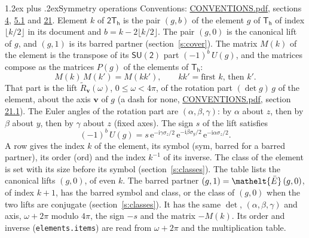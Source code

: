 \documentclass[10pt,a4paper]{article}
\makeatletter
\renewcommand\section{\@startsection{section}{1}{\z@}{-3ex plus -1ex minus -.2ex}%
  {1.2ex plus .2ex}{\normalfont\large\sffamily\bfseries\color{parttitle}}}
\numberwithin{equation}{section}
\newcommand{\eltfont}[1]{{\let\sigma\eltsigma\mathelt{#1}}}
\newcommand{\grp}[1]{\mathsf{#1}}
\newcommand{\elt}[1]{\eltfont{#1}}
\newcommand{\vv}{\mathbf{v}}
\newcommand{\iunit}{\mathrm{i}}
\newcommand{\expe}{\mathrm{e}}
\newcommand{\barred}[1]{\bar{#1}}
\newcommand{\lift}[1]{\tilde{#1}}
\newcommand{\pauli}[1]{\sigma_{#1}}
\makeatother
\begin{document}
\section{Symmetry operations}\label{s:elements}
Conventions: \href{../../CONVENTIONS.pdf}{CONVENTIONS.pdf}, sections \href{../../../rotation/CONVENTIONS.pdf\#conv.4}{4}, \href{../../../rotation/CONVENTIONS.pdf\#conv.5.1}{5.1} and \href{../../CONVENTIONS.pdf\#conv.21}{21}.
\leavevmode\label{n:index.element}\label{n:element.g}Element $k$ of $\grp{2T_{h}}$ is the pair $(g, b)$ of the element $g$ of \href{../../../rotation/data/pdf/Th.pdf}{$\grp{T_{h}}$} of index $\lfloor k/2\rfloor$ in its document and $b = k - 2\lfloor k/2\rfloor$. The pair $(g, 0)$ is the canonical lift of $g$, and $(g, 1)$ is its barred partner (section~\ref{s:cover}). \label{n:matrix.element.pin}\label{n:matrix.element}The matrix $M(k)$ of the element is the transpose of its $\grp{SU(2)}$ part $(-1)^{b}\,U(g)$, and the matrices compose as the matrices $P(g)$ of the elements of $\grp{T_{h}}$:
\begin{equation}\label{e:mprod}M(k)\,M(k') = M(kk'),\qquad kk' = \text{first } k\text{, then } k'.\end{equation}
\leavevmode\label{n:angle.omega}\label{n:vector.axis}\label{n:vector.pole}That part is the lift $\lift{R}_{\vv}(\omega)$, $0 \le \omega < 4\pi$, of the rotation part $(\det g)\,g$ of the element, about the axis $\vv$ of $g$ (a dash for none, \href{../../CONVENTIONS.pdf}{CONVENTIONS.pdf}, section \href{../../CONVENTIONS.pdf\#conv.21.1}{21.1}). \label{n:angle.euler.alpha}\label{n:angle.euler.beta}\label{n:angle.euler.gamma}\label{n:vector.coordinates}The Euler angles of the rotation part are $(\alpha,\beta,\gamma)$: by $\alpha$ about $z$, then by $\beta$ about $y$, then by $\gamma$ about $z$ (fixed axes). \label{n:local.euler.sign}The sign $s$ of the lift satisfies
\begin{equation}\label{e:euler}(-1)^{b}\,U(g) = s\,\expe^{-\iunit\gamma\pauli{z}/2}\,\expe^{-\iunit\beta\pauli{y}/2}\,\expe^{-\iunit\alpha\pauli{z}/2}.\end{equation}
\leavevmode\label{n:index.element.inverse}\label{n:head.sym}\label{n:head.ord}A row gives the index $k$ of the element, its symbol (sym, barred for a barred partner), its order (ord) and the index $k^{-1}$ of its inverse. \label{n:head.class}The class of the element is set with its size before its symbol (section~\ref{s:classes}).
The table lists the canonical lifts $(g, 0)$, of even $k$. The barred partner $(g, 1) = \elt{\barred{E}}\,(g, 0)$, of index $k + 1$, has the barred symbol and class, or the class of $(g, 0)$ when the two lifts are conjugate (section~\ref{s:classes}). It has the same $\det$, $(\alpha,\beta,\gamma)$ and axis, $\omega + 2\pi$ modulo $4\pi$, the sign $-s$ and the matrix $-M(k)$. Its order and inverse (\texttt{elements.items}) are read from $\omega + 2\pi$ and the multiplication table.
\end{document}
